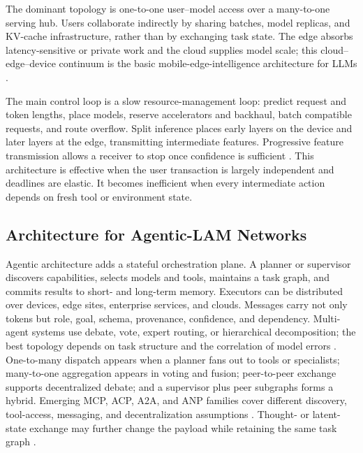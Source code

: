 \documentclass[letterpaper,journal]{IEEEtran}
\begin{document}
The dominant topology is one-to-one user--model access over a many-to-one
serving hub. Users collaborate indirectly by sharing batches, model replicas,
and KV-cache infrastructure, rather than by exchanging task state. The edge
absorbs latency-sensitive or private work and the cloud supplies model scale;
this cloud--edge--device continuum is the basic mobile-edge-intelligence
architecture for LLMs \cite{edgeLLMsurvey}.

The main control loop is a slow resource-management loop: predict request and
token lengths, place models, reserve accelerators and backhaul, batch
compatible requests, and route overflow. Split inference places early layers
on the device and later layers at the edge, transmitting intermediate
features. Progressive feature transmission allows a receiver to stop once
confidence is sufficient \cite{progressive}. This architecture is effective
when the user transaction is largely independent and deadlines are elastic.
It becomes inefficient when every intermediate action depends on fresh tool
or environment state.

\subsection{Architecture for Agentic-LAM Networks}
Agentic architecture adds a stateful orchestration plane. A planner or
supervisor discovers capabilities, selects models and tools, maintains a task
graph, and commits results to short- and long-term memory. Executors can be
distributed over devices, edge sites, enterprise services, and clouds.
Messages carry not only tokens but role, goal, schema, provenance, confidence,
and dependency. Multi-agent systems use debate, vote, expert routing, or
hierarchical decomposition; the best topology depends on task structure and
the correlation of model errors \cite{agentsmobile,du_debate,estornell}.
One-to-many dispatch appears when a planner fans out to tools or specialists;
many-to-one aggregation appears in voting and fusion; peer-to-peer exchange
supports decentralized debate; and a supervisor plus peer subgraphs forms a
hybrid. Emerging MCP, ACP, A2A, and ANP families cover different discovery,
tool-access, messaging, and decentralization assumptions
\cite{agentprotocols}. Thought- or latent-state exchange may further change the
payload while retaining the same task graph \cite{thoughtcomm,latentcomm}.
\end{document}
